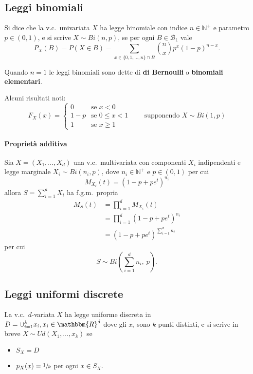 \documentclass[11pt,a4paper,twoside]{article}
\let\leq\leqslant%
\let\geq\geqslant%
\newcommand\N{\mathbb{N}}
\newcommand\R{\mathbbm{R}}
\newcommand\B{\mathcal{B}}
\newcommand\smallsum{\textstyle\sum}
\begin{document}
\subsection{Leggi binomiali}
Si dice che la v.c.\ univariata \(X\) ha legge binomiale con indice
\(n \in \N^+\) e parametro \(p\in (0,1)\), e si scrive \(X\sim Bi(n,
p)\), se per ogni \(B \in \B_1\) vale
\[
  P_X(B) = P(X\in B) = \sum_{x\in\{0,1,\dots,n\}\cap B} {n\choose x}p^x(1-p)^{n-x}.
\]

Quando \(n = 1\) le leggi binomiali sono dette di \textbf{di
  Bernoulli} o \textbf{binomiali elementari}.

Alcuni risultati noti:
\[
  F_X(x) = \begin{cases}
    0   & \mbox{se } x < 0 \\
    1-p & \mbox{se } 0\leq x < 1 \\
    1   & \mbox{se } x\geq 1
  \end{cases}\qquad\mbox{supponendo } X\sim Bi(1, p)
\]

\paragraph{Proprietà additiva}
Sia \(X = (X_1, \dots, X_d)\) una v.c.\ multivariata con componenti
\(X_i\) indipendenti e legge marginale \(X_i\sim Bi(n_i, p)\), dove
\(n_i \in \N^+\) e \(p \in (0,1)\) per cui
\[
  M_{X_i}(t) = \left( 1 - p + pe^t\right)^{n_i}
\]
allora \(S = \sum_{i=1}^d X_i\) ha f.g.m.\ propria
\begin{align*}
  M_S(t) &= \prod_{i=1}^d M_{X_i}(t) \\
         &= \prod_{i=1}^d \left( 1-p+pe^t \right)^{n_i} \\
         &= \left( 1 - p + pe^t \right)^{\sum_{i=1}^d n_i}
\end{align*}
per cui
\[
  S \sim Bi\left( \smallsum_{i=1}^d n_i, \: p \right).
\]

\subsection{Leggi uniformi discrete}
La v.c.\ \(d\)-variata \(X\) ha legge uniforme discreta in \(D =
\cup_{i=1}^k{x_i}, x_i\in \R^d\) dove gli \(x_i\) sono \(k\) punti
distinti, e si scrive in breve \(X\sim Ud(X_1,\dots, x_k)\) se
\begin{itemize}
\item \(S_X = D\)
\item \(p_X(
  x) = \sfrac{1}{k}\) per ogni \(x \in S_X\).
\end{itemize}
\end{document}
